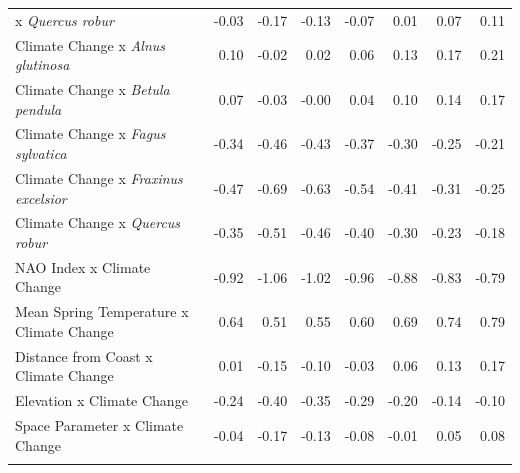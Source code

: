 \documentclass{article}\usepackage[]{graphicx}\usepackage[]{color}
\begin{document}
\begin{longtable}{lrrrrrrr}
x\textit{ Quercus robur} & -0.03 & -0.17 & -0.13 & -0.07 & 0.01 & 0.07 & 0.11 \\ 
  Climate Change
x\textit{ Alnus glutinosa} & 0.10 & -0.02 & 0.02 & 0.06 & 0.13 & 0.17 & 0.21 \\ 
  Climate Change
x\textit{ Betula pendula} & 0.07 & -0.03 & -0.00 & 0.04 & 0.10 & 0.14 & 0.17 \\ 
  Climate Change
x\textit{ Fagus sylvatica} & -0.34 & -0.46 & -0.43 & -0.37 & -0.30 & -0.25 & -0.21 \\ 
  Climate Change
x\textit{ Fraxinus excelsior} & -0.47 & -0.69 & -0.63 & -0.54 & -0.41 & -0.31 & -0.25 \\ 
  Climate Change
x\textit{ Quercus robur} & -0.35 & -0.51 & -0.46 & -0.40 & -0.30 & -0.23 & -0.18 \\ 
  NAO Index x Climate Change & -0.92 & -1.06 & -1.02 & -0.96 & -0.88 & -0.83 & -0.79 \\ 
  Mean Spring 
Temperature x Climate Change & 0.64 & 0.51 & 0.55 & 0.60 & 0.69 & 0.74 & 0.79 \\ 
  Distance from 
Coast x Climate Change & 0.01 & -0.15 & -0.10 & -0.03 & 0.06 & 0.13 & 0.17 \\ 
  Elevation x Climate Change & -0.24 & -0.40 & -0.35 & -0.29 & -0.20 & -0.14 & -0.10 \\ 
  Space Parameter x Climate Change & -0.04 & -0.17 & -0.13 & -0.08 & -0.01 & 0.05 & 0.08 \\ 
   \hline
\hline
\label{tab:suppmodfive}
\end{longtable}
\end{document}
